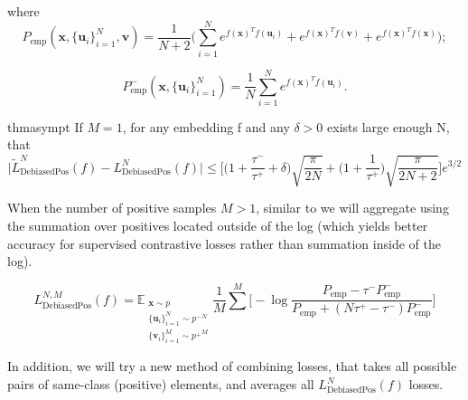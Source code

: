 \documentclass{article}
\begin{document}
where
\begin{equation} \label{eq:13}
P_{\text{emp}} (\textbf{x}, \{\textbf{u}_i\}_{i=1}^N, \textbf{v}) = \frac{1}{N+2} \bigg(\sum \limits_{i=1}^N e^{f(\textbf{x})^T f(\textbf{u}_i)} + e^{f(\textbf{x})^T f(\textbf{v})} + e^{f(\textbf{x})^T f(\textbf{x})}\bigg);
\end{equation}

\begin{equation} \label{eq:14}
P_{\text{emp}}^- (\textbf{x}, \{\textbf{u}_i\}_{i=1}^N) = \frac{1}{N} \sum \limits_{i=1}^N e^{f(\textbf{x})^T f(\textbf{u}_i)}.
\end{equation}

\begin{restatable}[]{thm}{asympt}
\label{thm:asympt}
If $M = 1$, for any embedding f and any $\delta > 0$ exists large enough N, that
\begin{equation} \label{eq:12}
\big|\tilde{L}_{\text{DebiasedPos}}^N (f) - L_{\text{DebiasedPos}}^N (f)\big| \leq \bigg[\bigg(1 + \frac{\tau^-}{\tau^+} + \delta\bigg) \sqrt{\frac{\pi}{2N}} + \bigg(1 + \frac{1}{\tau^+}\bigg) \sqrt{\frac{\pi}{2N + 2}}\bigg] e^{3/2}
\end{equation}
\end{restatable}

When the number of positive samples $M > 1$, similar to \citep{khosla2021supervised} we will aggregate using the summation over positives located outside of the log (which yields better accuracy for supervised contrastive losses rather than summation inside of the log).

\begin{equation} \label{eq:14}
L_{\text{DebiasedPos}}^{N, M} (f) = \mathbb{E}_{\substack{\textbf{x} \sim p \\ \{\textbf{u}_i\}_{i=1}^N \sim {p^-}^N \\ \{\textbf{v}_i\}_{i=1}^M\sim {p^+}^M}} \frac{1}{M} \sum\limits^M \bigg[-\log \frac{P_{\text{emp}} - \tau^- P_{\text{emp}}^-}{P_{\text{emp}} + (N \tau^+ - \tau^-) P_{\text{emp}}^-}\bigg]
\end{equation}

In addition, we will try a new method of combining losses, that takes all possible pairs of same-class (positive) elements, and averages all $L_{\text{DebiasedPos}}^N (f)$ losses.


\end{document}

